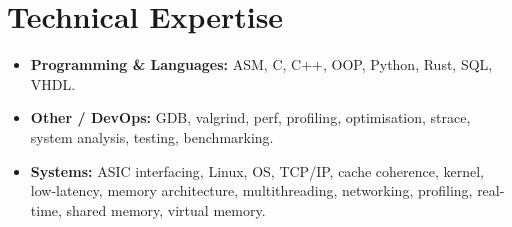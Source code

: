 \documentclass[9pt,a4paper]{article}
\begin{document}
\section*{Technical Expertise}
\begin{tcolorbox}[mybox]
\begin{itemize}
\item \textbf{Programming \& Languages:} ASM, C, C++, OOP, Python, Rust, SQL, VHDL.

\item \textbf{Other / DevOps:} GDB, valgrind, perf, profiling, optimisation, strace, system analysis, testing, benchmarking.

\item \textbf{Systems:} ASIC interfacing, Linux, OS, TCP/IP, cache coherence, kernel, low-latency, memory architecture, multithreading, networking, profiling, real-time, shared memory, virtual memory.
\end{itemize}
\end{tcolorbox}
\end{document}
